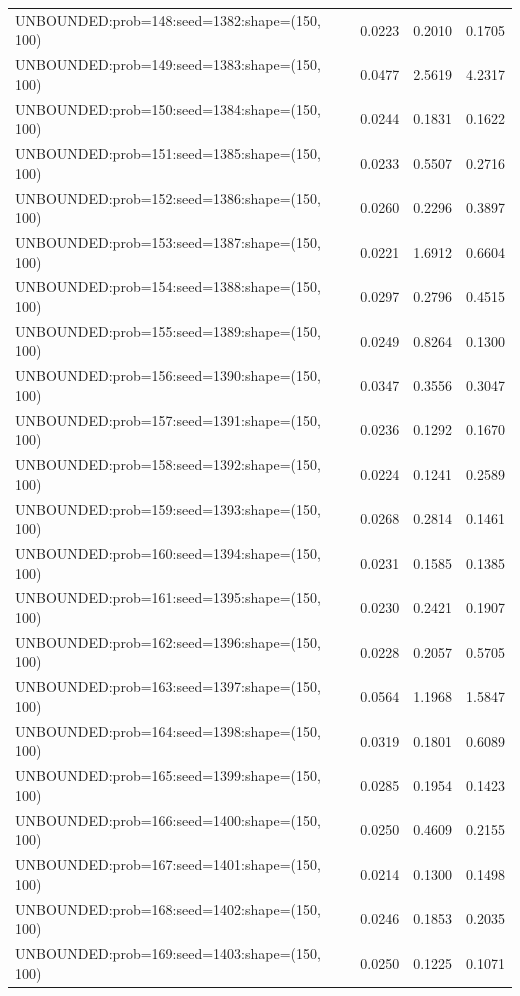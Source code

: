 \begin{longtable}{lccc}
UNBOUNDED:prob=148:seed=1382:shape=(150, 100) &   0.0223 &  0.2010 &  0.1705 \\
UNBOUNDED:prob=149:seed=1383:shape=(150, 100) &   0.0477 &  2.5619 &  4.2317 \\
UNBOUNDED:prob=150:seed=1384:shape=(150, 100) &   0.0244 &  0.1831 &  0.1622 \\
UNBOUNDED:prob=151:seed=1385:shape=(150, 100) &   0.0233 &  0.5507 &  0.2716 \\
UNBOUNDED:prob=152:seed=1386:shape=(150, 100) &   0.0260 &  0.2296 &  0.3897 \\
UNBOUNDED:prob=153:seed=1387:shape=(150, 100) &   0.0221 &  1.6912 &  0.6604 \\
UNBOUNDED:prob=154:seed=1388:shape=(150, 100) &   0.0297 &  0.2796 &  0.4515 \\
UNBOUNDED:prob=155:seed=1389:shape=(150, 100) &   0.0249 &  0.8264 &  0.1300 \\
UNBOUNDED:prob=156:seed=1390:shape=(150, 100) &   0.0347 &  0.3556 &  0.3047 \\
UNBOUNDED:prob=157:seed=1391:shape=(150, 100) &   0.0236 &  0.1292 &  0.1670 \\
UNBOUNDED:prob=158:seed=1392:shape=(150, 100) &   0.0224 &  0.1241 &  0.2589 \\
UNBOUNDED:prob=159:seed=1393:shape=(150, 100) &   0.0268 &  0.2814 &  0.1461 \\
UNBOUNDED:prob=160:seed=1394:shape=(150, 100) &   0.0231 &  0.1585 &  0.1385 \\
UNBOUNDED:prob=161:seed=1395:shape=(150, 100) &   0.0230 &  0.2421 &  0.1907 \\
UNBOUNDED:prob=162:seed=1396:shape=(150, 100) &   0.0228 &  0.2057 &  0.5705 \\
UNBOUNDED:prob=163:seed=1397:shape=(150, 100) &   0.0564 &  1.1968 &  1.5847 \\
UNBOUNDED:prob=164:seed=1398:shape=(150, 100) &   0.0319 &  0.1801 &  0.6089 \\
UNBOUNDED:prob=165:seed=1399:shape=(150, 100) &   0.0285 &  0.1954 &  0.1423 \\
UNBOUNDED:prob=166:seed=1400:shape=(150, 100) &   0.0250 &  0.4609 &  0.2155 \\
UNBOUNDED:prob=167:seed=1401:shape=(150, 100) &   0.0214 &  0.1300 &  0.1498 \\
UNBOUNDED:prob=168:seed=1402:shape=(150, 100) &   0.0246 &  0.1853 &  0.2035 \\
UNBOUNDED:prob=169:seed=1403:shape=(150, 100) &   0.0250 &  0.1225 &  0.1071 \\

\end{longtable}
